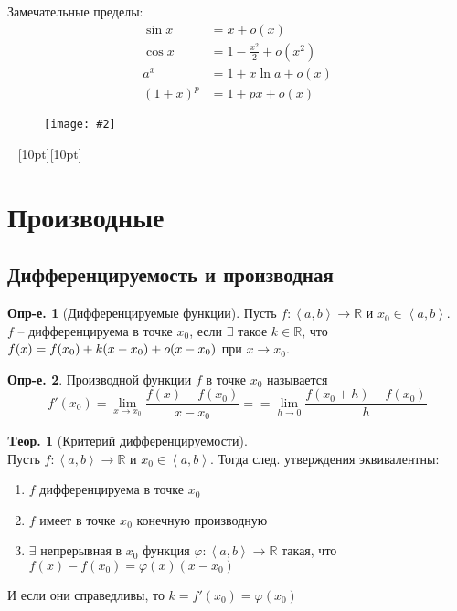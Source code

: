 \documentclass[a4paper,12pt]{article}
\newcommand*{\hm}[1]{#1\nobreak\discretionary{}{\hbox{$\mathsurround=0pt #1$}}{}}
\numberwithin{figure}{section}
\theoremstyle{definition}
\newtheorem{definition}{Опр-е.}[section]
\theoremstyle{definition}
\newtheorem{theorem}{Tеор.}[section]
\def\RR{\mathbb{R}}
\def\on{\!:}
\def\intab{\left<a,b\right>}
\def\vignette{\vspace{48pt} \noindent \hrulefill~ \raisebox{-8pt}[10pt][10pt]{\Huge\ding{102}}~ \hrulefill}
\newcommand\CenterFigure[2]{
	\begin{figure}[H]
		\centering
		\texttt{[image: \#2]}
	\end{figure}
}
\begin{document}
\medskip
Замечательные пределы:
\begin{align*}
	   \sin x &= x + o(x)
	\\ \cos x &= 1 - \frac{x^2}2 + o(x^2)
	\\ a^x &= 1 + x \ln a + o(x)
	\\ (1+x)^p &= 1 + px + o(x)
\end{align*}

\CenterFigure{\linewidth}{small-o-test-1.png}


\vignette
\section{Производные}


\subsection{Дифференцируемость и производная}


\begin{definition}[Дифференцируемые функции]
	Пусть $f\on\intab\to\RR$ и $x_0\in\intab$. \\
	$f$ -- дифференцируема в точке $x_0$, если $\exists$ такое $k\in\RR$,
	что $f(x) = f(x_0) \hm+ k(x-x_0) \hm+ o(x-x_0)$ при $x\to x_0$.
\end{definition}


\begin{definition}
	Производной функции $f$ в точке $x_0$ называется
	\[ f'(x_0) = \lim_{x\to x_0}\frac{f(x)-f(x_0)}{x-x_0}=
			   = \lim_{h\to0}\frac{f(x_0+h)-f(x_0)}h \]
\end{definition}
\bigskip

\begin{theorem}[Критерий дифференцируемости] \ \\
	Пусть $f\on \intab\to\RR$ и $x_0\in\intab$.
	Тогда след. утверждения эквивалентны:
	\begin{enumerate}
		\item $f$ дифференцируема в точке $x_0$
		\item $f$ имеет в точке $x_0$ конечную производную
		\item $\exists$ непрерывная в $x_0$ функция $\varphi\on\intab\to\RR$
			  такая, что $f(x)-f(x_0) = \varphi(x)(x-x_0)$
	\end{enumerate}
	И если они справедливы, то $k=f'(x_0)=\varphi(x_0)$
\end{theorem}
\bigskip
\end{document}
